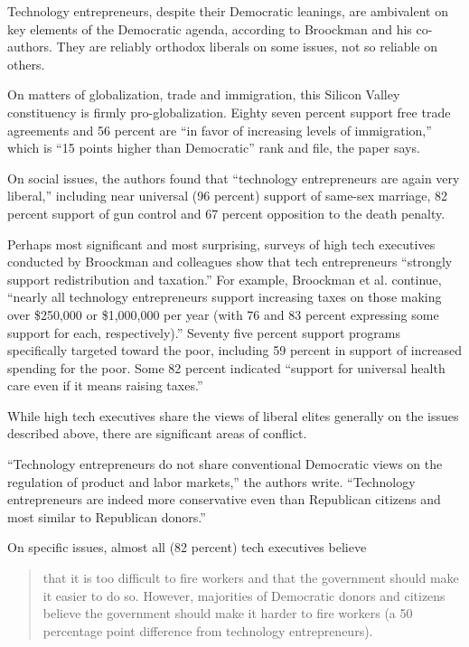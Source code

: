Technology entrepreneurs, despite their Democratic leanings, are
ambivalent on key elements of the Democratic agenda, according to
Broockman and his co-authors. They are reliably orthodox liberals on
some issues, not so reliable on others.

On matters of globalization, trade and immigration, this Silicon Valley
constituency is firmly pro-globalization. Eighty seven percent support
free trade agreements and 56 percent are ``in favor of increasing levels
of immigration,'' which is ``15 points higher than Democratic'' rank and
file, the paper says.

On social issues, the authors found that ``technology entrepreneurs are
again very liberal,'' including near universal (96 percent) support of
same-sex marriage, 82 percent support of gun control and 67 percent
opposition to the death penalty.

Perhaps most significant and most surprising, surveys of high tech
executives conducted by Broockman and colleagues show that tech
entrepreneurs ``strongly support redistribution and taxation.'' For
example, Broockman et al. continue, ``nearly all technology
entrepreneurs support increasing taxes on those making over \$250,000 or
\$1,000,000 per year (with 76 and 83 percent expressing some support for
each, respectively).'' Seventy five percent support programs
specifically targeted toward the poor, including 59 percent in support
of increased spending for the poor. Some 82 percent indicated ``support
for universal health care even if it means raising taxes.''

While high tech executives share the views of liberal elites generally
on the issues described above, there are significant areas of conflict.

``Technology entrepreneurs do not share conventional Democratic views on
the regulation of product and labor markets,'' the authors write.
``Technology entrepreneurs are indeed more conservative even than
Republican citizens and most similar to Republican donors.''

On specific issues, almost all (82 percent) tech executives believe

\begin{quote}
that it is too difficult to fire workers and that the government should
make it easier to do so. However, majorities of Democratic donors and
citizens believe the government should make it harder to fire workers (a
50 percentage point difference from technology entrepreneurs).
\end{quote}

